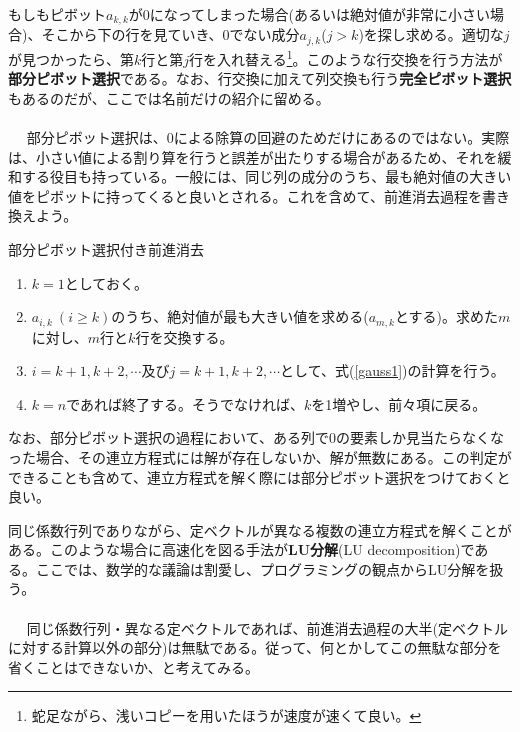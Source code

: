 もしもピボット$a_{k,k}$が0になってしまった場合(あるいは絶対値が非常に小さい場合)、そこから下の行を見ていき、0でない成分$a_{j,k}$($j>k$)を探し求める。適切な$j$が見つかったら、第$k$行と第$j$行を入れ替える\footnote{蛇足ながら、浅いコピーを用いたほうが速度が速くて良い。}。このような行交換を行う方法が\textbf{部分ピボット選択}である。なお、行交換に加えて列交換も行う\textbf{完全ピボット選択}もあるのだが、ここでは名前だけの紹介に留める。
\\ \\　
部分ピボット選択は、0による除算の回避のためだけにあるのではない。実際は、小さい値による割り算を行うと誤差が出たりする場合があるため、それを緩和する役目も持っている。一般には、同じ列の成分のうち、最も絶対値の大きい値をピボットに持ってくると良いとされる。これを含めて、前進消去過程を書き換えよう。
\begin{itembox}[l]{部分ピボット選択付き前進消去}
\begin{enumerate}
\item $k=1$としておく。
\item $a_{i,k}\ (i\ge k)$のうち、絶対値が最も大きい値を求める($a_{m,k}$とする)。求めた$m$に対し、$m$行と$k$行を交換する。
\item $i=k+1,k+2,\cdots$及び$j=k+1,k+2,\cdots$として、式(\ref{gauss1})の計算を行う。
\item $k=n$であれば終了する。そうでなければ、$k$を1増やし、前々項に戻る。
\end{enumerate}
\end{itembox}

なお、部分ピボット選択の過程において、ある列で0の要素しか見当たらなくなった場合、その連立方程式には解が存在しないか、解が無数にある。この判定ができることも含めて、連立方程式を解く際には部分ピボット選択をつけておくと良い。

同じ係数行列でありながら、定ベクトルが異なる複数の連立方程式を解くことがある。このような場合に高速化を図る手法が\textbf{LU分解}(LU decomposition)である。ここでは、数学的な議論は割愛し、プログラミングの観点からLU分解を扱う。
\\ \\　
同じ係数行列・異なる定ベクトルであれば、前進消去過程の大半(定ベクトルに対する計算以外の部分)は無駄である。従って、何とかしてこの無駄な部分を省くことはできないか、と考えてみる。

